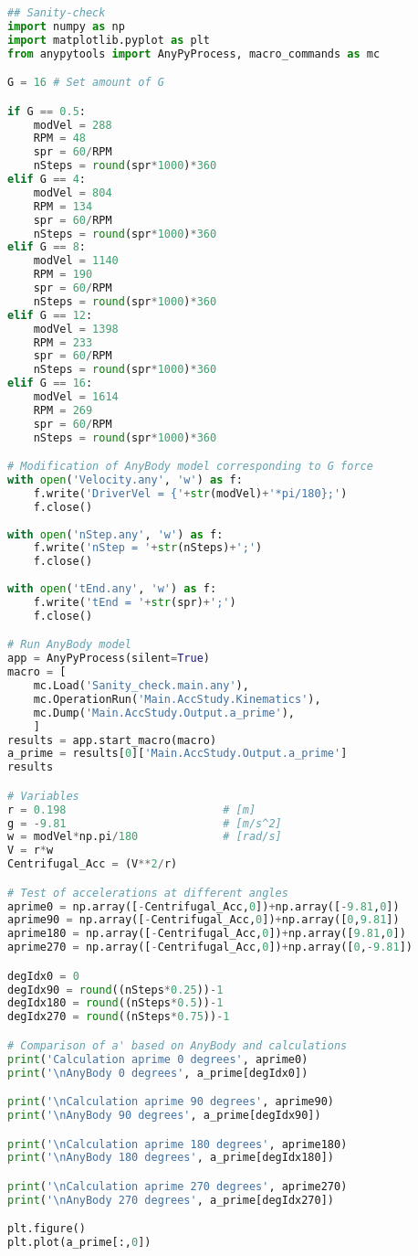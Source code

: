 \begin{lstlisting}[language=Python]
## Sanity-check
import numpy as np
import matplotlib.pyplot as plt
from anypytools import AnyPyProcess, macro_commands as mc

G = 16 # Set amount of G

if G == 0.5:
    modVel = 288
    RPM = 48
    spr = 60/RPM
    nSteps = round(spr*1000)*360
elif G == 4:
    modVel = 804
    RPM = 134
    spr = 60/RPM
    nSteps = round(spr*1000)*360
elif G == 8:
    modVel = 1140
    RPM = 190
    spr = 60/RPM
    nSteps = round(spr*1000)*360
elif G == 12:
    modVel = 1398
    RPM = 233
    spr = 60/RPM
    nSteps = round(spr*1000)*360
elif G == 16:
    modVel = 1614
    RPM = 269
    spr = 60/RPM
    nSteps = round(spr*1000)*360

# Modification of AnyBody model corresponding to G force
with open('Velocity.any', 'w') as f:
    f.write('DriverVel = {'+str(modVel)+'*pi/180};') 
    f.close()
     
with open('nStep.any', 'w') as f:
    f.write('nStep = '+str(nSteps)+';')              
    f.close()
 
with open('tEnd.any', 'w') as f:
    f.write('tEnd = '+str(spr)+';')                 
    f.close()

# Run AnyBody model
app = AnyPyProcess(silent=True)
macro = [
    mc.Load('Sanity_check.main.any'),
    mc.OperationRun('Main.AccStudy.Kinematics'),
    mc.Dump('Main.AccStudy.Output.a_prime'),
    ]
results = app.start_macro(macro)
a_prime = results[0]['Main.AccStudy.Output.a_prime']
results

# Variables
r = 0.198                        # [m]
g = -9.81                        # [m/s^2]
w = modVel*np.pi/180             # [rad/s]
V = r*w
Centrifugal_Acc = (V**2/r)

# Test of accelerations at different angles
aprime0 = np.array([-Centrifugal_Acc,0])+np.array([-9.81,0])
aprime90 = np.array([-Centrifugal_Acc,0])+np.array([0,9.81])
aprime180 = np.array([-Centrifugal_Acc,0])+np.array([9.81,0])
aprime270 = np.array([-Centrifugal_Acc,0])+np.array([0,-9.81])

degIdx0 = 0
degIdx90 = round((nSteps*0.25))-1
degIdx180 = round((nSteps*0.5))-1
degIdx270 = round((nSteps*0.75))-1

# Comparison of a' based on AnyBody and calculations
print('Calculation aprime 0 degrees', aprime0)
print('\nAnyBody 0 degrees', a_prime[degIdx0])

print('\nCalculation aprime 90 degrees', aprime90)
print('\nAnyBody 90 degrees', a_prime[degIdx90])

print('\nCalculation aprime 180 degrees', aprime180)
print('\nAnyBody 180 degrees', a_prime[degIdx180])

print('\nCalculation aprime 270 degrees', aprime270)
print('\nAnyBody 270 degrees', a_prime[degIdx270])

plt.figure()
plt.plot(a_prime[:,0])
\end{lstlisting}
\clearpage